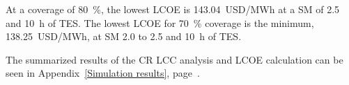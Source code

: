 At a coverage of \SI{80}{\percent}, the lowest \ac{LCOE} is \SI{143.04}{USD/MWh} at a \ac{SM} of 2.5 and \SI{10}{h} of \ac{TES}. The lowest \ac{LCOE} for \SI{70}{\percent} coverage is the minimum, \SI{138.25}{USD/MWh}, at \ac{SM} 2.0 to 2.5 and \SI{10}{h} of \ac{TES}.

The summarized results of the \ac{CR} \ac{LCC} analysis and \ac{LCOE} calculation can be seen in Appendix~\ref{Simulation results}, page~\pageref{tbl: CR_results}.